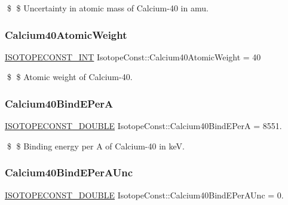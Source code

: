 \$ \$ Uncertainty in atomic mass of Calcium-\/40 in amu. \mbox{\label{group___isotope_const-_calcium-_ca40_ga2e5cabd8fe78b87970ab024e37f44fc2}} 
\subsubsection{\texorpdfstring{Calcium40\+Atomic\+Weight}{Calcium40AtomicWeight}}
{\footnotesize\ttfamily \mbox{\hyperlink{group___isotope_const-_macros_ga5f18360b3e99483a35c32d789e62621c}{I\+S\+O\+T\+O\+P\+E\+C\+O\+N\+S\+T\+\_\+\+I\+NT}} Isotope\+Const\+::\+Calcium40\+Atomic\+Weight = 40}

\$ \$ Atomic weight of Calcium-\/40. \mbox{\label{group___isotope_const-_calcium-_ca40_ga0e00f4606627b6664d2946ed6d1b2995}} 
\subsubsection{\texorpdfstring{Calcium40\+Bind\+E\+PerA}{Calcium40BindEPerA}}
{\footnotesize\ttfamily \mbox{\hyperlink{group___isotope_const-_macros_ga8f45a7272ce02c0b4c65c44636ed719a}{I\+S\+O\+T\+O\+P\+E\+C\+O\+N\+S\+T\+\_\+\+D\+O\+U\+B\+LE}} Isotope\+Const\+::\+Calcium40\+Bind\+E\+PerA = 8551.}

\$ \$ Binding energy per A of Calcium-\/40 in keV. \mbox{\label{group___isotope_const-_calcium-_ca40_gafada7c1eae21996b00e31d761993c73b}} 
\subsubsection{\texorpdfstring{Calcium40\+Bind\+E\+Per\+A\+Unc}{Calcium40BindEPerAUnc}}
{\footnotesize\ttfamily \mbox{\hyperlink{group___isotope_const-_macros_ga8f45a7272ce02c0b4c65c44636ed719a}{I\+S\+O\+T\+O\+P\+E\+C\+O\+N\+S\+T\+\_\+\+D\+O\+U\+B\+LE}} Isotope\+Const\+::\+Calcium40\+Bind\+E\+Per\+A\+Unc = 0.}

